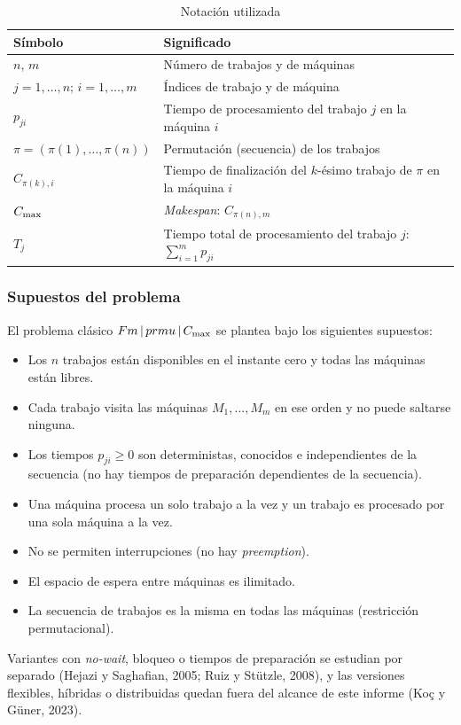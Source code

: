 \begin{table}[htbp]
\caption{Notación utilizada}\label{tab:notacion}
\centering
\begin{tabularx}{\textwidth}{@{}l X@{}}
\toprule
Símbolo & Significado \\
\midrule
$n$, $m$ & Número de trabajos y de máquinas \\
$j = 1,\ldots,n$;\; $i = 1,\ldots,m$ & Índices de trabajo y de máquina \\
$p_{ji}$ & Tiempo de procesamiento del trabajo $j$ en la máquina $i$ \\
$\pi = (\pi(1),\ldots,\pi(n))$ & Permutación (secuencia) de los trabajos \\
$C_{\pi(k),i}$ & Tiempo de finalización del $k$-ésimo trabajo de $\pi$ en la máquina $i$ \\
$C_{\max}$ & \textit{Makespan}: $C_{\pi(n),m}$ \\
$T_j$ & Tiempo total de procesamiento del trabajo $j$: $\sum_{i=1}^m p_{ji}$ \\
\bottomrule
\end{tabularx}
\end{table}

\subsubsection{Supuestos del problema}

El problema clásico $Fm\,|\,prmu\,|\,C_{\max}$ se plantea bajo los siguientes supuestos:
\begin{itemize}
  \item Los $n$ trabajos están disponibles en el instante cero y todas las máquinas
        están libres.
  \item Cada trabajo visita las máquinas $M_1,\ldots,M_m$ en ese orden y no puede
        saltarse ninguna.
  \item Los tiempos $p_{ji}\ge 0$ son deterministas, conocidos e independientes de la
        secuencia (no hay tiempos de preparación dependientes de la secuencia).
  \item Una máquina procesa un solo trabajo a la vez y un trabajo es procesado por una
        sola máquina a la vez.
  \item No se permiten interrupciones (no hay \textit{preemption}).
  \item El espacio de espera entre máquinas es ilimitado.
  \item La secuencia de trabajos es la misma en todas las máquinas (restricción
        permutacional).
\end{itemize}
Variantes con \textit{no-wait}, bloqueo o tiempos de preparación se estudian por
separado (Hejazi y Saghafian, 2005; Ruiz y Stützle, 2008), y las versiones flexibles,
híbridas o distribuidas quedan fuera del alcance de este informe (Koç y Güner, 2023).

